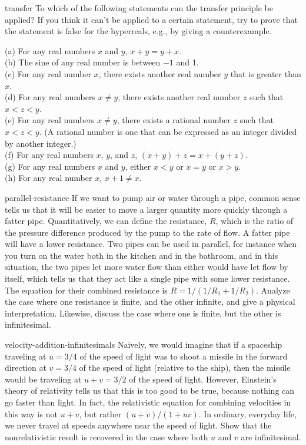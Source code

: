 \begin{hwsection}
\begin{hwwithsoln}{transfer}
To which of the following statements can the transfer principle be applied? If you think it can't be applied
to a certain statement, try to prove that the statement is false for the hyperreals, e.g., by giving a
counterexample.

(a) For any real numbers $x$ and $y$, $x+y=y+x$.\\
(b) The sine of any real number is between $-1$ and 1.\\
(c) For any real number $x$, there exists another real number $y$ that is greater than $x$.\\
(d) For any real numbers $x\ne y$, there exists another real number $z$ such that $x<z<y$.\\
(e) For any real numbers $x\ne y$, there exists a rational number $z$ such that $x<z<y$. (A rational number is
one that can be expressed as an integer divided by another integer.)\\
(f) For any real numbers $x$, $y$, and $z$, $(x+y)+z=x+(y+z)$.\\
(g) For any real numbers $x$ and $y$, either $x<y$ or $x=y$ or $x>y$.\\
(h) For any real number $x$, $x+1\ne x$.
\end{hwwithsoln}

\begin{hwwithsoln}{parallel-resistance}
If we want to pump air or water through a pipe, common sense tells us that it will be easier
to move a larger quantity more quickly through a fatter pipe. Quantitatively, we can define
the resistance, $R$, which is the ratio of the pressure difference produced by the pump to the
rate of flow. A fatter pipe will have a lower resistance. Two pipes can be used in parallel,
for instance when you turn on the water both in the kitchen and in the bathroom, and in this
situation, the two pipes let more water flow than either would have let flow by itself, which
tells us that they act like a single pipe with some lower resistance. The equation for their
combined resistance is $R=1/(1/R_1+1/R_2)$. Analyze the case where one resistance is finite,
and the other infinite, and give a physical interpretation. Likewise, discuss the case where
one is finite, but the other is infinitesimal.
\end{hwwithsoln}

\begin{hwwithsoln}{velocity-addition-infinitesimals}
Naively, we would imagine that if a spaceship traveling at $u=3/4$ of the speed of light was to shoot a missile
in the forward direction at $v=3/4$ of the speed of light (relative to the ship), then the missile would be traveling at $u+v=3/2$ of the
speed of light. However, Einstein's theory of relativity tells us that this is too good to be true, because
nothing can go faster than light. In fact, the relativistic equation for combining velocities in this way
is not $u+v$, but rather $(u+v)/(1+uv)$. In ordinary, everyday life, we never travel at speeds anywhere near
the speed of light. Show that the nonrelativistic result is recovered in the case where both $u$ and $v$ are
infinitesimal.
\end{hwwithsoln}


\end{hwsection}
